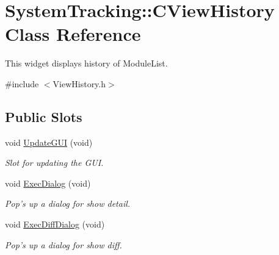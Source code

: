 \hypertarget{classSystemTracking_1_1CViewHistory}{\section{\-System\-Tracking\-:\-:\-C\-View\-History \-Class \-Reference}
\label{classSystemTracking_1_1CViewHistory}
}


\-This widget displays history of \-Module\-List.  




{\ttfamily \#include $<$\-View\-History.\-h$>$}

\subsection*{\-Public \-Slots}
\begin{DoxyCompactItemize}
\item 
void \hyperlink{classSystemTracking_1_1CViewHistory_a19c72259b5f7d0c848858dfe675bd566}{\-Update\-G\-U\-I} (void)
\begin{DoxyCompactList}\small\item\em \-Slot for updating the \-G\-U\-I. \end{DoxyCompactList}\item 
void \hyperlink{classSystemTracking_1_1CViewHistory_a770d4e2036ca9b4179df92fd2d42f391}{\-Exec\-Dialog} (void)
\begin{DoxyCompactList}\small\item\em \-Pop's up a dialog for show detail. \end{DoxyCompactList}\item 
void \hyperlink{classSystemTracking_1_1CViewHistory_ad736527d1274520547ae2a90cb092acd}{\-Exec\-Diff\-Dialog} (void)
\begin{DoxyCompactList}\small\item\em \-Pop's up a dialog for show diff. \end{DoxyCompactList}\end{DoxyCompactItemize}
